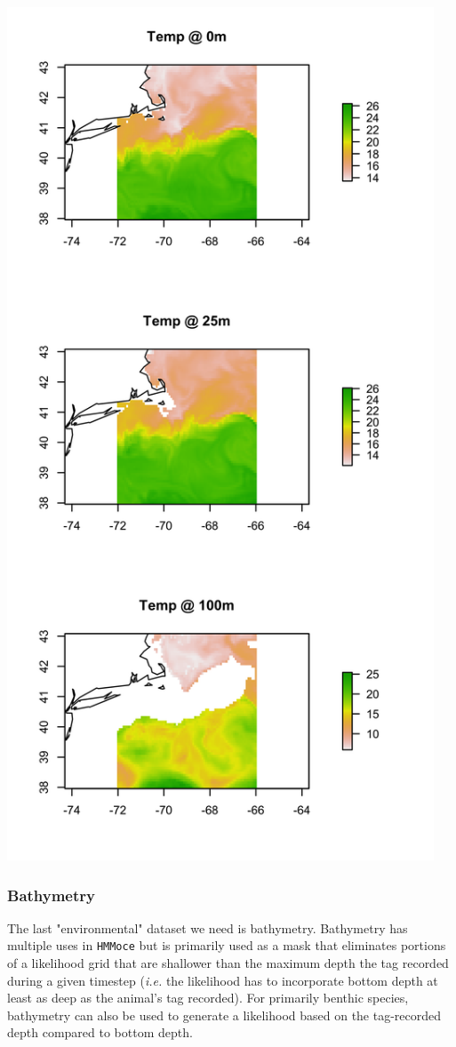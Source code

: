 \documentclass{article}\usepackage[]{graphicx}\usepackage[]{color}
\newcommand{\ie}{\textit{i.e.} }
\begin{document}
\includegraphics[width=5in, keepaspectratio]{./example_hycom.png}

\subsubsection{Bathymetry}

The last "environmental" dataset we need is bathymetry. Bathymetry has multiple uses in \texttt{HMMoce} but is primarily used as a mask that eliminates portions of a likelihood grid that are shallower than the maximum depth the tag recorded during a given timestep (\ie the likelihood has to incorporate bottom depth at least as deep as the animal's tag recorded). For primarily benthic species, bathymetry can also be used to generate a likelihood based on the tag-recorded depth compared to bottom depth.
\end{document}
